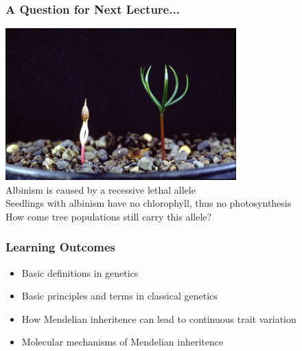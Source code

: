 \documentclass{beamer}
\begin{document}
\begin{frame}
	\frametitle{A Question for Next Lecture...}
	\begin{center}
		\includegraphics[keepaspectratio,width=3.5in]{img/albino} \\
		Albinism is caused by a recessive lethal allele\\
		Seedlings with albinism have no chlorophyll, thus no photosynthesis\\
		How come tree populations still carry this allele? 
	\end{center}
\end{frame}

\begin{frame}
	
	\frametitle{Learning Outcomes}
	
	\Large
	\begin{itemize}
	\item   Basic definitions in genetics
	\item	Basic principles and terms in classical genetics
	\item   How Mendelian inheritence can lead to continuous trait variation 
	\item	Molecular mechanisms of Mendelian inheritence
	\end{itemize}
	
\end{frame}

\end{document}
